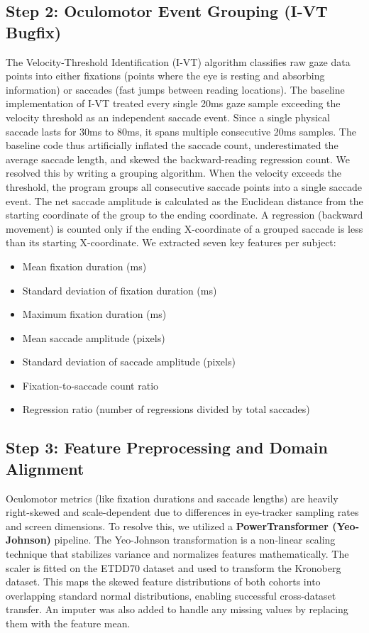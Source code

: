 \documentclass[journal]{IEEEtran}
\begin{document}
\subsection{Step 2: Oculomotor Event Grouping (I-VT Bugfix)}
The Velocity-Threshold Identification (I-VT) algorithm classifies raw gaze data points into either fixations (points where the eye is resting and absorbing information) or saccades (fast jumps between reading locations). 
The baseline implementation of I-VT treated every single 20ms gaze sample exceeding the velocity threshold as an independent saccade event. Since a single physical saccade lasts for 30ms to 80ms, it spans multiple consecutive 20ms samples. The baseline code thus artificially inflated the saccade count, underestimated the average saccade length, and skewed the backward-reading regression count.
We resolved this by writing a grouping algorithm. When the velocity exceeds the threshold, the program groups all consecutive saccade points into a single saccade event. The net saccade amplitude is calculated as the Euclidean distance from the starting coordinate of the group to the ending coordinate. A regression (backward movement) is counted only if the ending X-coordinate of a grouped saccade is less than its starting X-coordinate. We extracted seven key features per subject:
\begin{itemize}
    \item Mean fixation duration (ms)
    \item Standard deviation of fixation duration (ms)
    \item Maximum fixation duration (ms)
    \item Mean saccade amplitude (pixels)
    \item Standard deviation of saccade amplitude (pixels)
    \item Fixation-to-saccade count ratio
    \item Regression ratio (number of regressions divided by total saccades)
\end{itemize}

\subsection{Step 3: Feature Preprocessing and Domain Alignment}
Oculomotor metrics (like fixation durations and saccade lengths) are heavily right-skewed and scale-dependent due to differences in eye-tracker sampling rates and screen dimensions. 
To resolve this, we utilized a \textbf{PowerTransformer (Yeo-Johnson)} pipeline. The Yeo-Johnson transformation is a non-linear scaling technique that stabilizes variance and normalizes features mathematically. The scaler is fitted on the ETDD70 dataset and used to transform the Kronoberg dataset. This maps the skewed feature distributions of both cohorts into overlapping standard normal distributions, enabling successful cross-dataset transfer. An imputer was also added to handle any missing values by replacing them with the feature mean.
\end{document}
